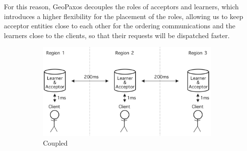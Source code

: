 For this reason, GeoPaxos decouples the roles of acceptors and learners, which introduces a higher flexibility for the placement of the roles, allowing us to keep acceptor entities close to each other for the ordering communications and the learners close to the clients, so that their requests will be dispatched faster.

\begin{figure}[htb]
  \centering
  \begin{subfigure}[b]{0.70\textwidth}
      \centering
          \includegraphics[width=\textwidth,height=\textheight,keepaspectratio]{img/decoupling_bad.png}
      \caption{Coupled}
      \label{fig:decoupling_bad}
  \end{subfigure}
  \hfill
  \begin{subfigure}[b]{0.22\textwidth}
      \centering

\end{subfigure}
\end{figure}
